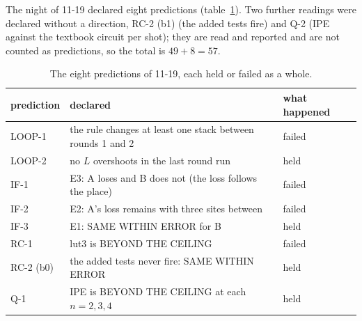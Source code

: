 \documentclass[10pt,a4paper]{article}
\begin{document}
The night of 11-19 declared eight predictions (table~\ref{tab:pred19}). Two further readings were declared without a
direction, RC-2 (b1) (the added tests fire) and Q-2 (IPE against the textbook circuit per shot); they are read and
reported and are not counted as predictions, so the total is $49 + 8 = 57$.
\begin{table}[H]
\centering\small
\begin{tabular}{@{}lp{8.6cm}l@{}}
\toprule
prediction & declared & what happened \\
\midrule
LOOP-1 & the rule changes at least one stack between rounds 1 and 2 & failed \\
LOOP-2 & no $L$ overshoots in the last round run & held \\
IF-1 & E3: A loses and B does not (the loss follows the place) & failed \\
IF-2 & E2: A's loss remains with three sites between & failed \\
IF-3 & E1: SAME WITHIN ERROR for B & held \\
RC-1 & lut3 is BEYOND THE CEILING & failed \\
RC-2 (b0) & the added tests never fire: SAME WITHIN ERROR & held \\
Q-1 & IPE is BEYOND THE CEILING at each $n = 2, 3, 4$ & held \\
\bottomrule
\end{tabular}
\caption{The eight predictions of 11-19, each held or failed as a whole.}
\label{tab:pred19}
\end{table}
\end{document}
